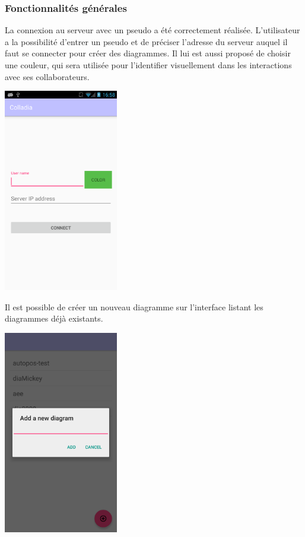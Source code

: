 \subsubsection{Fonctionnalités générales}
La connexion au serveur avec un pseudo a été correctement réalisée. L'utilisateur a la possibilité d'entrer un pseudo et de préciser l'adresse du serveur auquel il faut se connecter pour créer des diagrammes. Il lui est aussi proposé de choisir une couleur, qui sera utilisée pour l'identifier visuellement dans les interactions avec ses collaborateurs. \par
    \begin{minipage}{\linewidth}
      \centering
      \includegraphics[width=5cm]{img/screen/new/colladia_connexion}
    \end{minipage}

Il est possible de créer un nouveau diagramme sur l'interface listant les diagrammes déjà existants.\par
		\begin{minipage}{\linewidth}
			\centering
			\includegraphics[width=5cm]{img/screen/colladia_create_workspace}
    \end{minipage}

